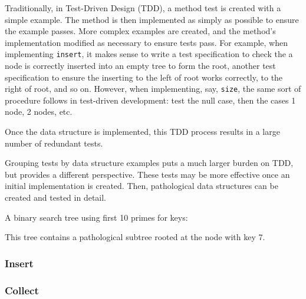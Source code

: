 \documentclass{article}
\begin{document}
Traditionally, in Test-Driven Design (TDD), a method test is created with a simple example.
The method is then implemented as simply as possible to ensure the example passes.
More complex examples are created, and the method's implementation modified as necessary
to ensure tests pass. For example, when implementing {\tt insert}, it makes sense
to write a test specification to check the a node is correctly inserted into an
empty tree to form the root, another test specification to ensure the inserting
to the left of root works correctly, to the right of root, and so on. However,
when implementing, say, {\tt size}, the same sort of procedure follows in test-driven
development: test the null case, then the cases 1 node, 2 nodes, etc.

Once the data structure is implemented, this TDD process results in a large number
of redundant tests.

Grouping tests by data structure examples puts a much larger burden on TDD,
but provides a different perspective. These tests may be more effective once an
initial implementation is created. Then, pathological data structures can be
created and tested in detail.


A binary search tree using first 10 primes for keys:


This tree contains a pathological subtree rooted at the node with key 7.

\subsubsection{Insert}



\subsubsection{Collect}
\end{document}
